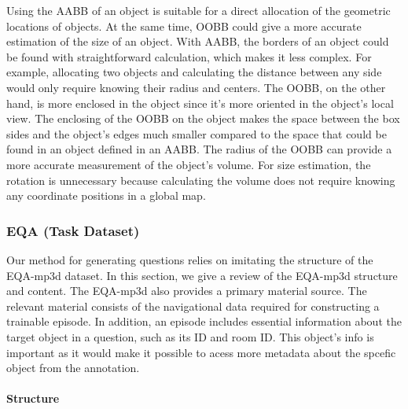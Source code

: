 Using the AABB of an object is suitable for a direct allocation of the geometric locations of objects. At the same time, OOBB could give a more accurate estimation of the size of an object. With AABB, the borders of an object could be found with straightforward calculation, which makes it less complex. For example, allocating two objects and calculating the distance between any side would only require knowing their radius and centers. The OOBB, on the other hand, is more enclosed in the object since it’s more oriented in the object’s local view. The enclosing of the OOBB on the object makes the space between the box sides and the object's edges much smaller compared to the space that could be found in an object defined in an AABB. The radius of the OOBB can provide a more accurate measurement of the object’s volume. For size estimation, the rotation is unnecessary because calculating the volume does not require knowing any coordinate positions in a global map.  



\subsubsection{EQA (Task Dataset)}

Our method for generating questions relies on imitating the structure of the EQA-mp3d dataset. In this section, we give a review of the EQA-mp3d structure and content. The EQA-mp3d also provides a primary material source. The relevant material consists of the navigational data required for constructing a trainable episode. In addition, an episode includes essential information about the target object in a question, such as its ID and room ID. This object's info is important as it would make it possible to acess more metadata about the spcefic object from the annotation. 

\paragraph{Structure}


